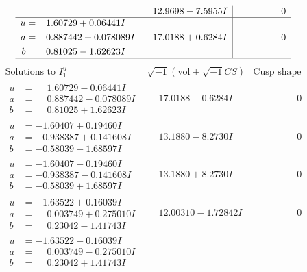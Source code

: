 \documentclass[1p]{elsarticle_modified}
\theoremstyle{definition}
\newcommand{\I}{\sqrt{-1}}
\begin{document}
$$\begin{array}{c|c|c}
 & \phantom{-}12.9698 - 7.5955 I & \phantom{-0.000000 } 0 \\ \hline\begin{aligned}
u &= \phantom{-}1.60729 + 0.06441 I \\
a &= \phantom{-}0.887442 + 0.078089 I \\
b &= \phantom{-}0.81025 - 1.62623 I\end{aligned}
 & \phantom{-}17.0188 + 0.6284 I & \phantom{-0.000000 } 0\\
 \hline 
 \end{array}$$\newpage$$\begin{array}{c|c|c}  
\text{Solutions to }I^u_{1}& \I (\text{vol} + \sqrt{-1}CS) & \text{Cusp shape}\\
 \hline 
\begin{aligned}
u &= \phantom{-}1.60729 - 0.06441 I \\
a &= \phantom{-}0.887442 - 0.078089 I \\
b &= \phantom{-}0.81025 + 1.62623 I\end{aligned}
 & \phantom{-}17.0188 - 0.6284 I & \phantom{-0.000000 } 0 \\ \hline\begin{aligned}
u &= -1.60407 + 0.19460 I \\
a &= -0.938387 + 0.141608 I \\
b &= -0.58039 - 1.68597 I\end{aligned}
 & \phantom{-}13.1880 - 8.2730 I & \phantom{-0.000000 } 0 \\ \hline\begin{aligned}
u &= -1.60407 - 0.19460 I \\
a &= -0.938387 - 0.141608 I \\
b &= -0.58039 + 1.68597 I\end{aligned}
 & \phantom{-}13.1880 + 8.2730 I & \phantom{-0.000000 } 0 \\ \hline\begin{aligned}
u &= -1.63522 + 0.16039 I \\
a &= \phantom{-}0.003749 + 0.275010 I \\
b &= \phantom{-}0.23042 - 1.41743 I\end{aligned}
 & \phantom{-}12.00310 - 1.72842 I & \phantom{-0.000000 } 0 \\ \hline\begin{aligned}
u &= -1.63522 - 0.16039 I \\
a &= \phantom{-}0.003749 - 0.275010 I \\
b &= \phantom{-}0.23042 + 1.41743 I\end{aligned}

\end{array}$$
\end{document}
